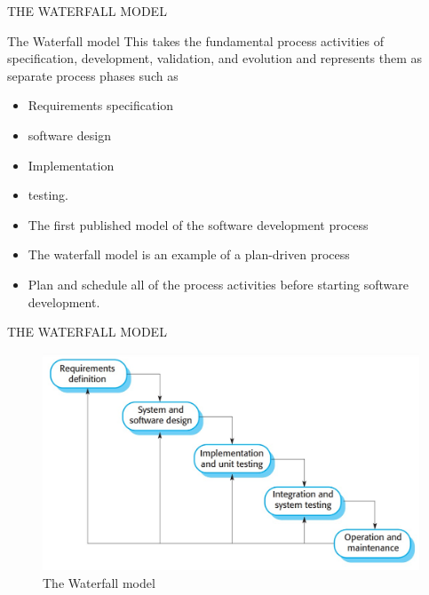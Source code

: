 \documentclass{beamer}
\begin{document}
\begin{frame}{THE WATERFALL MODEL}
	\begin{block}{The Waterfall model }
	This takes the fundamental process activities of specification, development, validation, and evolution and represents them as separate process phases such as 
	\begin{itemize}
		\item Requirements specification
		\item software design
		\item Implementation
		\item testing.
	\end{itemize}
	\end{block}
\begin{itemize}
	\item The first published model of the software development process
	\item The waterfall model is an example of a plan-driven process
	\item Plan and schedule all of the process activities before starting software development.
\end{itemize}
\end{frame}
\begin{frame}{THE WATERFALL MODEL}
\begin{figure}
	\includegraphics[scale=.45]{img/m1_5.jpg}
	\caption{The Waterfall model}
\end{figure}
\end{frame}
\end{document}
